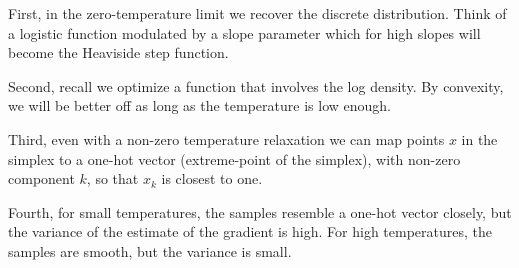 \documentclass[11pt]{article}
\begin{document}
First, in the zero-temperature limit we recover the discrete distribution. Think of a logistic function modulated by a slope parameter which for high slopes will become the Heaviside step function.

Second, recall we optimize a function that involves the log density. By convexity, we will be better off as long as the temperature is low enough.

Third, even with a non-zero temperature relaxation we can map points $x$ in the simplex to a one-hot vector (extreme-point of the simplex), with non-zero component $k$, so that $x_k$ is closest to one.

Fourth, for small temperatures, the samples resemble a one-hot vector closely, but the variance of the estimate of the gradient is high. For high temperatures, the samples are smooth, but the variance is small.


 
\end{document}
